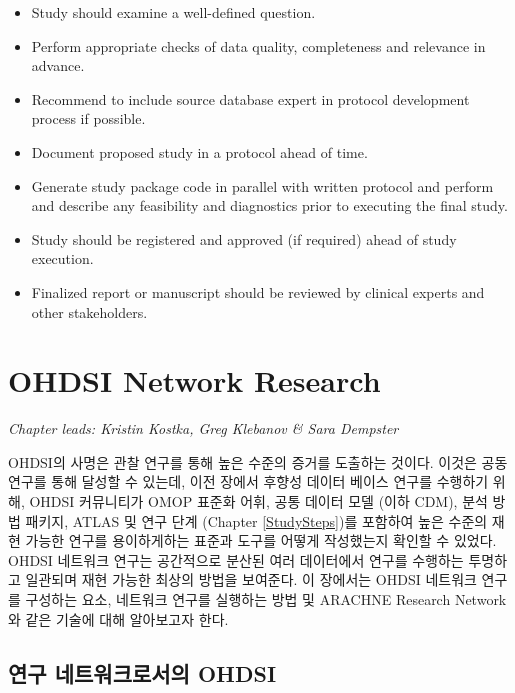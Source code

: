 \documentclass[11pt]{book}
\providecommand{\tightlist}{%
  \setlength{\itemsep}{0pt}\setlength{\parskip}{0pt}}
\theoremstyle{definition}
\theoremstyle{definition}
\theoremstyle{definition}
\theoremstyle{remark}
\let\BeginKnitrBlock\begin \let\EndKnitrBlock\end
\begin{document}
\BeginKnitrBlock{rmdsummary}
\begin{itemize}
\tightlist
\item
  Study should examine a well-defined question.
\item
  Perform appropriate checks of data quality, completeness and relevance
  in advance.
\item
  Recommend to include source database expert in protocol development
  process if possible.
\item
  Document proposed study in a protocol ahead of time.
\item
  Generate study package code in parallel with written protocol and
  perform and describe any feasibility and diagnostics prior to
  executing the final study.
\item
  Study should be registered and approved (if required) ahead of study
  execution.
\item
  Finalized report or manuscript should be reviewed by clinical experts
  and other stakeholders.
\end{itemize}
\EndKnitrBlock{rmdsummary}

\chapter{OHDSI Network Research}\label{NetworkResearch}

\emph{Chapter leads: Kristin Kostka, Greg Klebanov \& Sara Dempster}

OHDSI의 사명은 관찰 연구를 통해 높은 수준의 증거를 도출하는 것이다.
이것은 공동 연구를 통해 달성할 수 있는데, 이전 장에서 후향성 데이터
베이스 연구를 수행하기 위해, OHDSI 커뮤니티가 OMOP 표준화 어휘, 공통
데이터 모델 (이하 CDM), 분석 방법 패키지, ATLAS 및 연구 단계 (Chapter
\ref{StudySteps})를 포함하여 높은 수준의 재현 가능한 연구를 용이하게하는
표준과 도구를 어떻게 작성했는지 확인할 수 있었다. OHDSI 네트워크 연구는
공간적으로 분산된 여러 데이터에서 연구를 수행하는 투명하고 일관되며 재현
가능한 최상의 방법을 보여준다. 이 장에서는 OHDSI 네트워크 연구를
구성하는 요소, 네트워크 연구를 실행하는 방법 및 ARACHNE Research
Network와 같은 기술에 대해 알아보고자 한다.

\section{연구 네트워크로서의 OHDSI}\label{--ohdsi}

\end{document}
